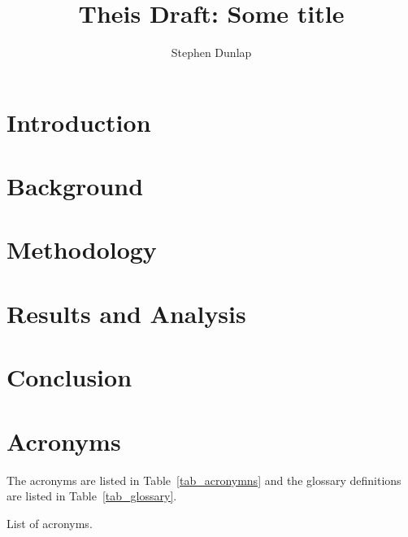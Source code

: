 \documentclass[]{afitthesis}
\title{ Theis Draft: Some title }
\author{ Stephen Dunlap }
\begin{document}
\maketitle %

\chapter{Introduction}




\chapter{Background}


\chapter{Methodology}



\chapter{Results and Analysis}




\chapter{Conclusion}




\appendix %

\chapter{Acronyms}


The acronyms are listed in Table~\ref{tab_acronymns} and the glossary
definitions are listed in Table~\ref{tab_glossary}.

\begin{table}[htbp!]
    \centering
    \caption{List of acronyms.}
    \printglossary[type=\acronymtype]
    \label{tab_acronymns}
\end{table}
\end{document}
